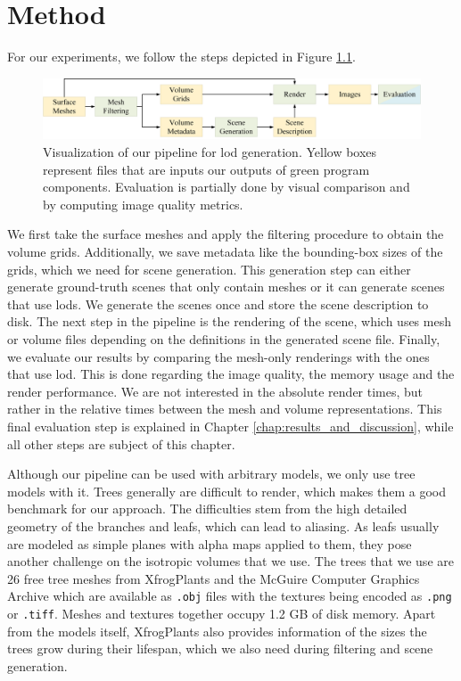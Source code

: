 \chapter{Method}
\label{chap:method}
For our experiments, we follow the steps depicted in Figure \ref{fig:pipeline}.
\begin{figure}[t]
    \centering
    \includegraphics[width=1.0\linewidth]{img/pipeline.png}
    \caption[Visualization of the pipeline the thesis built upon]{Visualization of our pipeline for \ac{lod} generation. Yellow boxes represent files that are inputs our outputs of green program components. Evaluation is partially done by visual comparison and by computing image quality metrics.}
    \label{fig:pipeline}
\end{figure}
We first take the surface meshes and apply the filtering procedure to obtain the volume grids.
Additionally, we save metadata like the bounding-box sizes of the grids, which we need for scene generation.
This generation step can either generate ground-truth scenes that only contain meshes or it can generate scenes that use \acp{lod}.
We generate the scenes once and store the scene description to disk.
The next step in the pipeline is the rendering of the scene, which uses mesh or volume files depending on the definitions in the generated scene file.
Finally, we evaluate our results by comparing the mesh-only renderings with the ones that use \ac{lod}.
This is done regarding the image quality, the memory usage and the render performance.
We are not interested in the absolute render times, but rather in the relative times between the mesh and volume representations.
This final evaluation step is explained in Chapter \ref{chap:results_and_discussion}, while all other steps are subject of this chapter.

Although our pipeline can be used with arbitrary models, we only use tree models with it.
Trees generally are difficult to render, which makes them a good benchmark for our approach.
The difficulties stem from the high detailed geometry of the branches and leafs, which can lead to aliasing.
As leafs usually are modeled as simple planes with alpha maps applied to them, they pose another challenge on the isotropic volumes that we use.
The trees that we use are 26 free tree meshes from XfrogPlants \cite{xfrogplants} and the McGuire Computer Graphics Archive \cite{McGuire2017Data} which are available as \texttt{.obj} files with the textures being encoded as \texttt{.png} or \texttt{.tiff}.
Meshes and textures together occupy 1.2 GB of disk memory.
Apart from the models itself, XfrogPlants also provides information of the sizes the trees grow during their lifespan, which we also need during filtering and scene generation.

